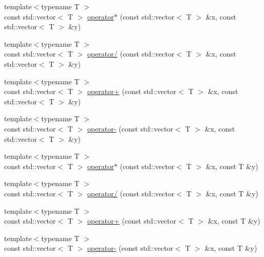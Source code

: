\begin{DoxyCompactItemize}
\item 
{\footnotesize template$<$typename T $>$ }\\const std\+::vector$<$ T $>$ \hyperlink{centroidalifold_2contrafold_2_utilities_8ipp_a39ede280ac0ede640abe16fae764c3ff}{operator$\ast$} (const std\+::vector$<$ T $>$ \&x, const std\+::vector$<$ T $>$ \&y)
\item 
{\footnotesize template$<$typename T $>$ }\\const std\+::vector$<$ T $>$ \hyperlink{centroidalifold_2contrafold_2_utilities_8ipp_a48c7b9167c56e63b4acc2594f220bb4b}{operator/} (const std\+::vector$<$ T $>$ \&x, const std\+::vector$<$ T $>$ \&y)
\item 
{\footnotesize template$<$typename T $>$ }\\const std\+::vector$<$ T $>$ \hyperlink{centroidalifold_2contrafold_2_utilities_8ipp_a1334f27e41c96504343e1ac33dcff63b}{operator+} (const std\+::vector$<$ T $>$ \&x, const std\+::vector$<$ T $>$ \&y)
\item 
{\footnotesize template$<$typename T $>$ }\\const std\+::vector$<$ T $>$ \hyperlink{centroidalifold_2contrafold_2_utilities_8ipp_a836b51b046bfe8e04dae3d2528bf6795}{operator-\/} (const std\+::vector$<$ T $>$ \&x, const std\+::vector$<$ T $>$ \&y)
\item 
{\footnotesize template$<$typename T $>$ }\\const std\+::vector$<$ T $>$ \hyperlink{centroidalifold_2contrafold_2_utilities_8ipp_a3653a21d9593e7501f638b10ef5bf85f}{operator$\ast$} (const std\+::vector$<$ T $>$ \&x, const T \&y)
\item 
{\footnotesize template$<$typename T $>$ }\\const std\+::vector$<$ T $>$ \hyperlink{centroidalifold_2contrafold_2_utilities_8ipp_a13cceb369f762a265498f2cc5c181aae}{operator/} (const std\+::vector$<$ T $>$ \&x, const T \&y)
\item 
{\footnotesize template$<$typename T $>$ }\\const std\+::vector$<$ T $>$ \hyperlink{centroidalifold_2contrafold_2_utilities_8ipp_a592ff9916895c92e5553df7e3185f49f}{operator+} (const std\+::vector$<$ T $>$ \&x, const T \&y)
\item 
{\footnotesize template$<$typename T $>$ }\\const std\+::vector$<$ T $>$ \hyperlink{centroidalifold_2contrafold_2_utilities_8ipp_abda54a09ef34c2781d786368b6248835}{operator-\/} (const std\+::vector$<$ T $>$ \&x, const T \&y)
\item 

\end{DoxyCompactItemize}
